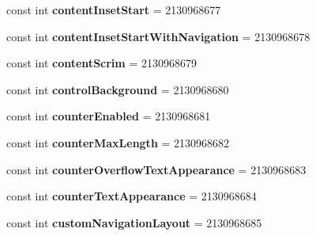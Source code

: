 \begin{DoxyCompactItemize}
const int {\bfseries content\+Inset\+Start} = 2130968677
\item 
\mbox{\label{classst_delivery_1_1_resource_1_1_attribute_a768382d7923f659b28ef2b72f634320d}} 
const int {\bfseries content\+Inset\+Start\+With\+Navigation} = 2130968678
\item 
\mbox{\label{classst_delivery_1_1_resource_1_1_attribute_adb3458d6495505238f404c13a6b9f3b0}} 
const int {\bfseries content\+Scrim} = 2130968679
\item 
\mbox{\label{classst_delivery_1_1_resource_1_1_attribute_a67e25dc69fc08dfe14b674843a499c4b}} 
const int {\bfseries control\+Background} = 2130968680
\item 
\mbox{\label{classst_delivery_1_1_resource_1_1_attribute_ada00250f29126d1cd612def8bc514146}} 
const int {\bfseries counter\+Enabled} = 2130968681
\item 
\mbox{\label{classst_delivery_1_1_resource_1_1_attribute_a9b10b304447abb426775c110bea4289c}} 
const int {\bfseries counter\+Max\+Length} = 2130968682
\item 
\mbox{\label{classst_delivery_1_1_resource_1_1_attribute_a76747f1a4cfb9f8ee7b9d82ebcb77023}} 
const int {\bfseries counter\+Overflow\+Text\+Appearance} = 2130968683
\item 
\mbox{\label{classst_delivery_1_1_resource_1_1_attribute_afaf556463496e0794fc83c3b5508166f}} 
const int {\bfseries counter\+Text\+Appearance} = 2130968684
\item 
\mbox{\label{classst_delivery_1_1_resource_1_1_attribute_a307160c85dc4a1eef908a2cb9ca3ca84}} 
const int {\bfseries custom\+Navigation\+Layout} = 2130968685
\item 
\mbox{\label{classst_delivery_1_1_resource_1_1_attribute_a14625884a8821567df8d93cd852b5f96}} 

\end{DoxyCompactItemize}
